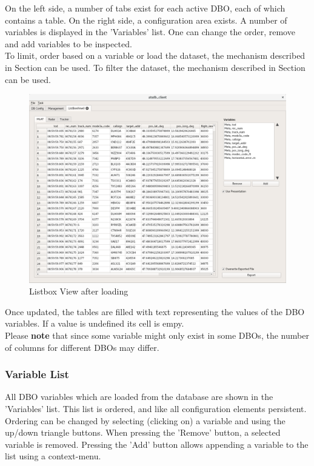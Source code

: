 \documentclass[10pt,letterpaper,extrafontsizes]{memoir}
\begin{document}
On the left side, a number of tabs exist for each active DBO, each of which contains a table. On the right side, a configuration area exists. A number of variables is displayed in the 'Variables' list. One can change the order, remove and add variables to be inspected. \\

To limit, order based on a variable or load the dataset, the mechanism described in Section  can be used. To filter the dataset, the mechanism described in Section  can be used.

\begin{figure}[H]
    \hspace*{-2cm}
    \includegraphics[width=18cm]{../screenshots/listbox_loaded.png}
  \caption{Listbox View after loading}
  \label{fig:listbox_load}
\end{figure}

Once updated, the tables are filled with text representing the values of the DBO variables.  If a value is undefined its cell is empy. \\

Please \textbf{note} that since some variable might only exist in some DBOs, the number of columns for different DBOs may differ.

\subsubsection{Variable List}
All DBO variables which are loaded from the database are shown in the 'Variables' list. This list is ordered,
and like all configuration elements persistent. Ordering can be changed by selecting (clicking on) a variable
and using the up/down triangle buttons.
When pressing the 'Remove' button, a selected variable is removed.  Pressing the 'Add' button allows
appending a variable to the list using a context-menu.
\end{document}
